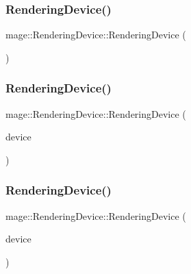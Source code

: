 \subsubsection{\texorpdfstring{Rendering\+Device()}{RenderingDevice()}\hspace{0.1cm}{\footnotesize\ttfamily [1/3]}}
{\footnotesize\ttfamily mage\+::\+Rendering\+Device\+::\+Rendering\+Device (\begin{DoxyParamCaption}{ }\end{DoxyParamCaption})\hspace{0.3cm}{\ttfamily [default]}}

\hypertarget{classmage_1_1_rendering_device_a6debbd87d19c4bf7e7cb44206a05dfff}{}\label{classmage_1_1_rendering_device_a6debbd87d19c4bf7e7cb44206a05dfff} 
\subsubsection{\texorpdfstring{Rendering\+Device()}{RenderingDevice()}\hspace{0.1cm}{\footnotesize\ttfamily [2/3]}}
{\footnotesize\ttfamily mage\+::\+Rendering\+Device\+::\+Rendering\+Device (\begin{DoxyParamCaption}\item[{\hyperlink{namespacemage_ae74f374780900893caa5555d1031fd79}{Com\+Ptr}$<$ I\+D3\+D11\+Device2 $>$}]{device }\end{DoxyParamCaption})}

\hypertarget{classmage_1_1_rendering_device_a097bab0f95e5f119ccad05833af417ae}{}\label{classmage_1_1_rendering_device_a097bab0f95e5f119ccad05833af417ae} 
\subsubsection{\texorpdfstring{Rendering\+Device()}{RenderingDevice()}\hspace{0.1cm}{\footnotesize\ttfamily [3/3]}}
{\footnotesize\ttfamily mage\+::\+Rendering\+Device\+::\+Rendering\+Device (\begin{DoxyParamCaption}\item[{const \hyperlink{classmage_1_1_rendering_device}{Rendering\+Device} \&}]{device }\end{DoxyParamCaption})\hspace{0.3cm}{\ttfamily [default]}}

